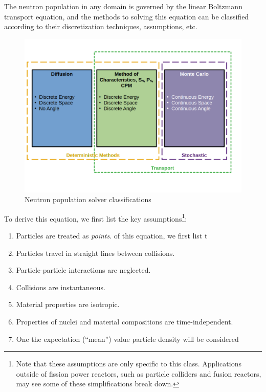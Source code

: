 The neutron population in any domain is governed by the linear Boltzmann transport equation, and the methods to solving this equation can be classified according to their discretization techniques, assumptions, etc.
\begin{figure}
  \centering
  \includegraphics[width=\textwidth]{figs/transport_eq_methods_classification}
  \caption{Neutron population solver classifications}
  \label{fig:solver-classifications}
\end{figure}
To derive this equation, we first list the key assumptions\footnote{Note that these assumptions are only specific to this class. Applications outside of fission power reactors, such as particle colliders and fusion reactors, may see some of these simplifications break down.}:
\begin{enumerate}
  \item Particles are treated as \textit{points}. of this equation, we first list t
  \item Particles travel in straight lines between collisions.
  \item Particle-particle interactions are neglected.
  \item Collisions are instantaneous.
  \item Material properties are isotropic.
  \item Properties of nuclei and material compositions are time-independent.
  \item One the expectation (``mean'') value particle density will be considered
\end{enumerate}

